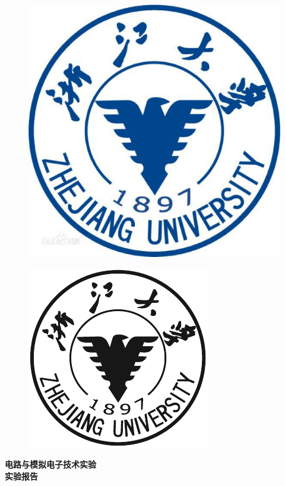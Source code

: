 \documentclass{article}
\begin{document}
\begin{titlepage}
        \vspace*{-2.5cm}
	
	\begin{figure}[h]
		\centering
		\includegraphics[width=0.7\linewidth]{zjdx}
	\end{figure}

	\begin{figure}[h]
		\centering
		\includegraphics[width=0.5\linewidth]{QSY}
	\end{figure}
	\vspace{-0.5cm}
	\begin{center}
		\Huge{\textbf{电路与模拟电子技术实验}}\\
		
		\Huge{\textbf{实验报告}}
	\end{center}
	
	
	\vspace*{1.5cm}


\end{titlepage}
\end{document}
